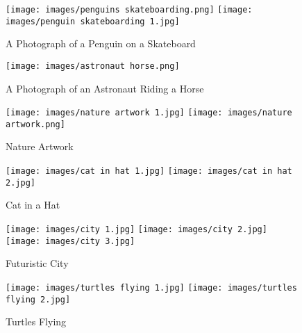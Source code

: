 \documentclass{article}
\begin{document}
\begin{figure}[h!]
\begin{center}
  \texttt{[image: images/penguins skateboarding.png]}
  \texttt{[image: images/penguin skateboarding 1.jpg]}
\end{center}
  \caption{A Photograph of a Penguin on a Skateboard}
  \label{fig:snorlax rain 1}
\end{figure}

\begin{figure}[h!]
\begin{center}
  \texttt{[image: images/astronaut horse.png]}
\end{center}
  \caption{A Photograph of an Astronaut Riding a Horse}
  \label{fig:astronaut riding horse}
\end{figure}

\begin{figure}[h!]
\begin{center}
\texttt{[image: images/nature artwork 1.jpg]}
    \texttt{[image: images/nature artwork.png]}
\end{center}
  \caption{Nature Artwork}
  \label{fig:nature artwork}
\end{figure}

\begin{figure}[h!]
\begin{center}
    \texttt{[image: images/cat in hat 1.jpg]}
    \texttt{[image: images/cat in hat 2.jpg]}
\end{center}
  \caption{Cat in a Hat}
  \label{fig:cat in hat}
\end{figure}

\begin{figure}[h!]
\begin{center}
    \texttt{[image: images/city 1.jpg]}
    \texttt{[image: images/city 2.jpg]}
    \texttt{[image: images/city 3.jpg]}
\end{center}
  \caption{Futuristic City}
  \label{fig:city}
\end{figure}

\begin{figure}[h!]
\begin{center}
    \texttt{[image: images/turtles flying 1.jpg]}
    \texttt{[image: images/turtles flying 2.jpg]}
\end{center}
  \caption{Turtles Flying}
  \label{fig:turtles flying}
\end{figure}
\end{document}
